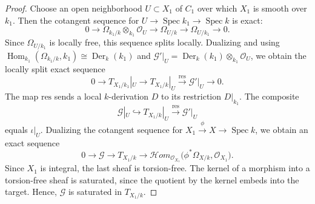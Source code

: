 \documentclass[10pt,abstract=true]{scrartcl}
\numberwithin{equation}{section}
\theoremstyle{definition}
\theoremstyle{remark}
\begin{document}
\begin{proof}
  Choose an open neighborhood $U \subset X_1$ of $C_1$ over which $X_1$ is smooth over $k_1$.
  Then the cotangent sequence for $U\to\operatorname{Spec}k_1\to\operatorname{Spec}k$ is exact:
  \[
    0\longrightarrow\Omega_{k_1/k}\otimes_{k_1}\mathcal O_U
    \longrightarrow\Omega_{U/k}
    \longrightarrow\Omega_{U/k_1}
    \longrightarrow0.
  \]
  Since $\Omega_{U/k_1}$ is locally free, this sequence splits locally.
  Dualizing and using $\operatorname{Hom}_{k_1}(\Omega_{k_1/k},k_1)\cong\operatorname{Der}_k(k_1)$ and $\mathscr G'|_U = \operatorname{Der}_k(k_1)\otimes_{k_1}\mathcal O_U$, we obtain  the locally split exact sequence
  \begin{equation}\label{eq:tangent-field-extension}
    0\longrightarrow T_{X_1/k_1}|_U
    \longrightarrow T_{X_1/k}|_U
    \xrightarrow{\mathrm{res}}\mathscr G'|_U
    \longrightarrow0.
  \end{equation}
  The map $\mathrm{res}$ sends a local $k$-derivation $D$ to its restriction $D|_{k_1}$.
  The composite
  \[
    \mathscr G|_U\hookrightarrow T_{X_1/k}|_U
    \xrightarrow{\mathrm{res}}\mathscr G'|_U
  \]
  equals $\iota|_U$.
  Dualizing the cotangent sequence for $X_1\xrightarrow{\phi}X\to\operatorname{Spec}k$, we obtain an exact sequence
  \[
    0\longrightarrow\mathscr G
    \longrightarrow T_{X_1/k}
    \longrightarrow\mathcal{H}om_{\mathcal O_{X_1}}
      \bigl(\phi^*\Omega_{X/k},\mathcal O_{X_1}\bigr).
  \]
  Since $X_1$ is integral, the last sheaf is torsion-free.
  The kernel of a morphism into a torsion-free sheaf is saturated, since the quotient by the kernel embeds into the target.
  Hence, $\mathscr G$ is saturated in $T_{X_1/k}$.


\end{proof}
\end{document}
